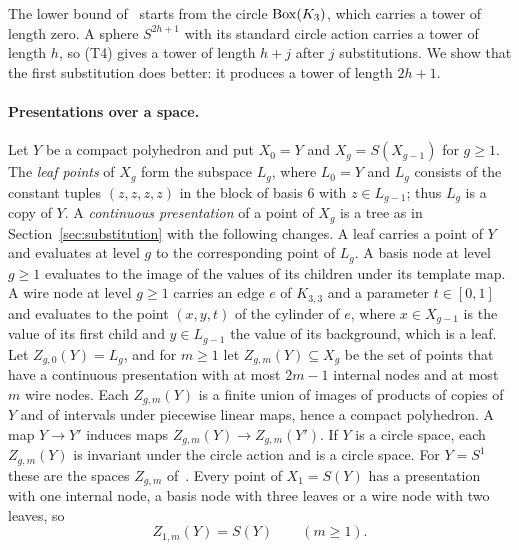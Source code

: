 The lower bound of~\cite{Z} starts from the circle $\operatorname{Box}(K_3)$, which carries a tower of length zero. A sphere $S^{2h+1}$ with its standard circle action carries a tower of length $h$, so (T4) gives a tower of length $h+j$ after $j$ substitutions. We show that the first substitution does better: it produces a tower of length $2h+1$.

\paragraph{Presentations over a space.}
Let $Y$ be a compact polyhedron and put $X_0=Y$ and $X_g=S(X_{g-1})$ for $g\ge1$. The \emph{leaf points} of $X_g$ form the subspace $L_g$, where $L_0=Y$ and $L_g$ consists of the constant tuples $(z,z,z,z)$ in the block of basis $6$ with $z\in L_{g-1}$; thus $L_g$ is a copy of $Y$. A \emph{continuous presentation} of a point of $X_g$ is a tree as in Section~\ref{sec:substitution} with the following changes. A leaf carries a point of $Y$ and evaluates at level $g$ to the corresponding point of $L_g$. A basis node at level $g\ge1$ evaluates to the image of the values of its children under its template map. A wire node at level $g\ge1$ carries an edge $e$ of $K_{3,3}$ and a parameter $t\in[0,1]$ and evaluates to the point $(x,y,t)$ of the cylinder of $e$, where $x\in X_{g-1}$ is the value of its first child and $y\in L_{g-1}$ the value of its background, which is a leaf. Let $Z_{g,0}(Y)=L_g$, and for $m\ge1$ let $Z_{g,m}(Y)\subseteq X_g$ be the set of points that have a continuous presentation with at most $2m-1$ internal nodes and at most $m$ wire nodes. Each $Z_{g,m}(Y)$ is a finite union of images of products of copies of $Y$ and of intervals under piecewise linear maps, hence a compact polyhedron. A map $Y\to Y'$ induces maps $Z_{g,m}(Y)\to Z_{g,m}(Y')$. If $Y$ is a circle space, each $Z_{g,m}(Y)$ is invariant under the circle action and is a circle space. For $Y=S^1$ these are the spaces $Z_{g,m}$ of~\cite[Appendix~B.1]{Z}. Every point of $X_1=S(Y)$ has a presentation with one internal node, a basis node with three leaves or a wire node with two leaves, so
\begin{equation}\label{eq:first-level}
 Z_{1,m}(Y)=S(Y)\qquad(m\ge1).
\end{equation}

